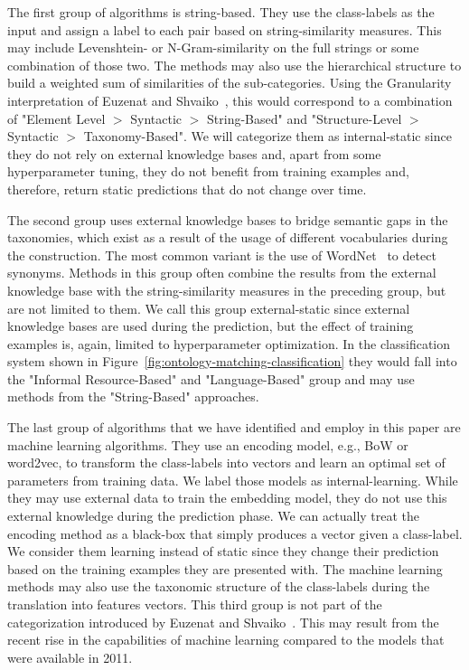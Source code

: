 The first group of algorithms is string-based.
They use the class-labels as the input and assign a label to each pair based on string-similarity measures.
This may include Levenshtein- or N-Gram-similarity on the full strings or some combination of those two.
The methods may also use the hierarchical structure to build a weighted sum of similarities of the sub-categories.
Using the Granularity interpretation of Euzenat and Shvaiko~\cite{euzenat2007ontology}, this would correspond to a
combination of "Element Level $>$ Syntactic $>$  String-Based" and "Structure-Level $>$ Syntactic $>$ Taxonomy-Based".
We will categorize them as internal-static since they do not rely on external knowledge bases and, apart from some
hyperparameter tuning, they do not benefit from training examples and, therefore, return static predictions that do not
change over time.

The second group uses external knowledge bases to bridge semantic gaps in the taxonomies, which exist as a result of the
usage of different vocabularies during the construction.
The most common variant is the use of WordNet~\cite{miller1995wordnet} to detect synonyms.
Methods in this group often combine the results from the external knowledge base with the string-similarity
measures in the preceding group, but are not limited to them.
We call this group external-static since external knowledge bases are used during the prediction, but the effect
of training examples is, again, limited to hyperparameter optimization.
In the classification system shown in Figure~\ref{fig:ontology-matching-classification} they would fall into the
"Informal Resource-Based" and "Language-Based" group and may use methods from the "String-Based" approaches.

The last group of algorithms that we have identified and employ in this paper are machine learning algorithms.
They use an encoding model, e.g., BoW or word2vec,
to transform the class-labels into vectors and learn an optimal set of parameters from training data.
We label those models as internal-learning.
While they may use external data to train the embedding model, they do not use this external knowledge during the
prediction phase.
We can actually treat the encoding method as a black-box that simply produces a vector given a class-label.
We consider them learning instead of static since they change their prediction based on the training examples they
are presented with.
The machine learning methods may also use the taxonomic structure of the class-labels during the translation into
features vectors.
This third group is not part of the categorization introduced by Euzenat and Shvaiko~\cite{euzenat2007ontology}.
This may result from the  recent rise in the capabilities of machine learning compared to the models that were available in 2011.

